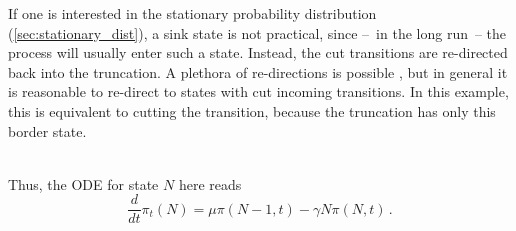 \begin{example}
  If one is interested in the stationary probability distribution
  (\autoref{sec:stationary_dist}), a sink state is not practical,
  since --~in the long run~-- the process will usually enter such a state.
  Instead, the cut transitions are re-directed back into the truncation.
  A plethora of re-directions is possible
  \parencite{gupta2017finite,kuntz2021stationary,spieler2014numerical},
  but in general it is reasonable to re-direct to states with cut
  incoming transitions.
  In this example, this is equivalent to cutting the transition,
  because the truncation has only this border state.
  \vspace{2em}\\
  \vspace{2em}\\
  Thus, the \ac{ODE} for state $N$ here reads
  \[
    \frac{d}{dt}\pi_t(N)=\mu \pi(N-1, t) - \gamma N\pi(N, t)\,.
  \]
\end{example}

